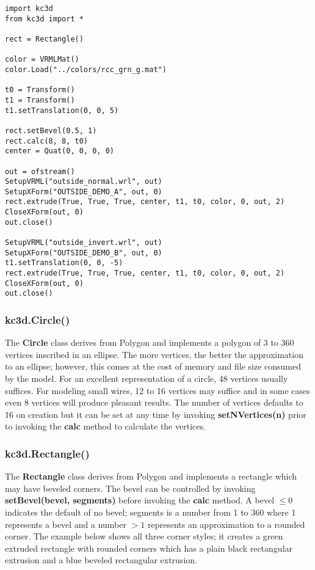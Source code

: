 \documentclass[a4paper, dvipdfm]{article}
\begin{document}
\begin{verbatim}
import kc3d
from kc3d import *

rect = Rectangle()

color = VRMLMat()
color.Load("../colors/rcc_grn_g.mat")

t0 = Transform()
t1 = Transform()
t1.setTranslation(0, 0, 5)

rect.setBevel(0.5, 1)
rect.calc(8, 8, t0)
center = Quat(0, 0, 0, 0)

out = ofstream()
SetupVRML("outside_normal.wrl", out)
SetupXForm("OUTSIDE_DEMO_A", out, 0)
rect.extrude(True, True, True, center, t1, t0, color, 0, out, 2)
CloseXForm(out, 0)
out.close()

SetupVRML("outside_invert.wrl", out)
SetupXForm("OUTSIDE_DEMO_B", out, 0)
t1.setTranslation(0, 0, -5)
rect.extrude(True, True, True, center, t1, t0, color, 0, out, 2)
CloseXForm(out, 0)
out.close()
\end{verbatim}

\subsubsection{kc3d.Circle()}
\label{sec:kc3dCircle}
The \textbf{Circle} class derives from Polygon and implements a polygon of
3 to 360 vertices inscribed in an ellipse.  The more vertices, the better the approximation
to an ellipse; however, this comes at the cost of memory and file size consumed by the
model.  For an excellent representation of a circle, 48 vertices usually suffices. For
modeling small wires, 12 to 16 vertices may suffice and in some cases even 8 vertices
will produce pleasant results. The number of vertices defaults to 16 on creation
but it can be set at any time by invoking \textbf{setNVertices(n)} prior to invoking
the \textbf{calc} method to calculate the vertices.

\subsubsection{kc3d.Rectangle()}
The \textbf{Rectangle} class derives from Polygon and implements a rectangle which
may have beveled corners. The bevel can be controlled by invoking \textbf{setBevel(bevel, segments)}
before invoking the \textbf{calc} method. A bevel $\le0$ indicates the default of no bevel; segments
is a number from 1 to 360 where 1 represents a bevel and a number $>1$ represents an approximation to
a rounded corner.  The example below shows all three corner styles; it creates a green extruded
rectangle with rounded corners which has a plain black rectangular extrusion and a blue
beveled rectangular extrusion.
\end{document}
